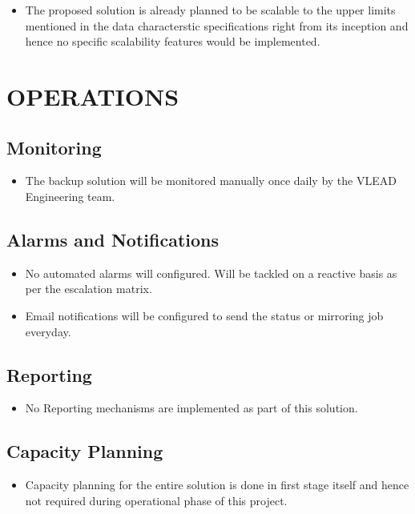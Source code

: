 \documentclass[11pt]{article}
\begin{document}
\begin{itemize}
\item The proposed solution is already planned to be scalable to the
     upper limits mentioned in the data characterstic specifications
     right from its inception and hence no specific
     scalability features would be implemented.
\end{itemize}
\section{OPERATIONS}
\label{sec-9}

\subsection{Monitoring}
\label{sec-9.1}

\begin{itemize}
\item The backup solution will be monitored manually once
   daily by the VLEAD Engineering team.
\end{itemize}
\subsection{Alarms and Notifications}
\label{sec-9.2}

\begin{itemize}
\item No automated alarms will configured. Will be tackled on a reactive
   basis as per the escalation matrix.
\item Email notifications will be configured to send the status or
   mirroring job everyday.
\end{itemize}
\subsection{Reporting}
\label{sec-9.3}

\begin{itemize}
\item No Reporting mechanisms are implemented as part of this solution.
\end{itemize}
\subsection{Capacity Planning}
\label{sec-9.4}

\begin{itemize}
\item Capacity planning for the entire solution is done in first stage
   itself and hence not required during operational phase of this
   project.
\end{itemize}
\end{document}
